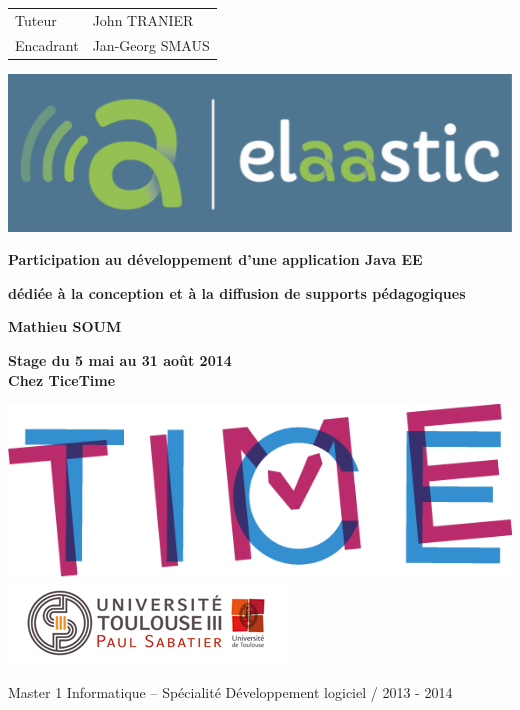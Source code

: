 \begin{titlepage}
\parindent=0pt
\begin{tabular}[h]{l@{ : }l}
  Tuteur & John TRANIER \\
  Encadrant & Jan-Georg SMAUS
\end{tabular}
\vspace{2cm}
\begin{center}
  \includegraphics[scale=0.5]{images/elaastic_blue.pdf}%
\end{center}
\vspace{2cm}
\hrulefill
\begin{center}\bfseries\Huge
  Participation au développement d’une application Java EE
\end{center}
\hrulefill
\begin{center}\bfseries\Large
  dédiée à la conception et à la diffusion de supports pédagogiques
\end{center}
\vspace*{0.5cm}
\begin{center}\bfseries\Large
  Mathieu SOUM
\end{center}
\vspace*{0.2cm}
\begin{center}\bfseries
  Stage du 5 mai au 31 août 2014\\Chez TiceTime
\end{center}
\vfill
\includegraphics[scale=0.25]{images/ticetime.png}%
\hfill
\includegraphics[scale=0.6]{images/logo.png}%
\vspace{1.7cm}
\begin{flushright}
  Master 1 Informatique -- Spécialité Développement logiciel / 2013 - 2014
\end{flushright}
  
\end{titlepage}
